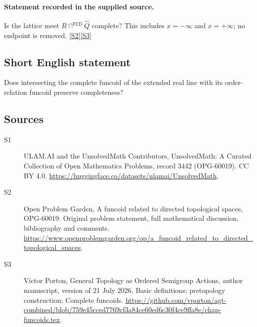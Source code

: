 \documentclass[11pt]{article}
\newcommand{\sref}[2]{\hyperlink{source:#1:#2}{[S#2]}}
\begin{document}
\paragraph{Statement recorded in the supplied source.}
Is the lattice meet $R\sqcap^{\mathsf{FCD}}\widehat Q$ complete? This includes $x=-\infty$ and $x=+\infty$; no endpoint is removed. \sref{3442}{2}\sref{3442}{3}
\subsection{Short English statement}
Does intersecting the complete funcoid of the extended real line with its order-relation funcoid preserve completeness?
\subsection{Sources}
\begin{description}
\item[\hypertarget{source:3442:1}{S1}] ULAM.AI and the UnsolvedMath Contributors, UnsolvedMath: A Curated Collection of Open Mathematics Problems, record 3442 (OPG-60019). CC BY 4.0. \url{https://huggingface.co/datasets/ulamai/UnsolvedMath}.
\item[\hypertarget{source:3442:2}{S2}] Open Problem Garden, A funcoid related to directed topological spaces, OPG-60019. Original problem statement, full mathematical discussion, bibliography and comments. \url{https://www.openproblemgarden.org/op/a_funcoid_related_to_directed_topological_spaces}.
\item[\hypertarget{source:3442:3}{S3}] Victor Porton, General Topology as Ordered Semigroup Actions, author manuscript, version of 21 July 2026. Basic definitions; pretopology construction; Complete funcoids. \url{https://github.com/vporton/agt-combined/blob/759e45cced7769cf3a84ce60ed6c30f4ce9ffa8e/chap-funcoids.tex}.
\end{description}
\label{end:3442}
\end{document}
